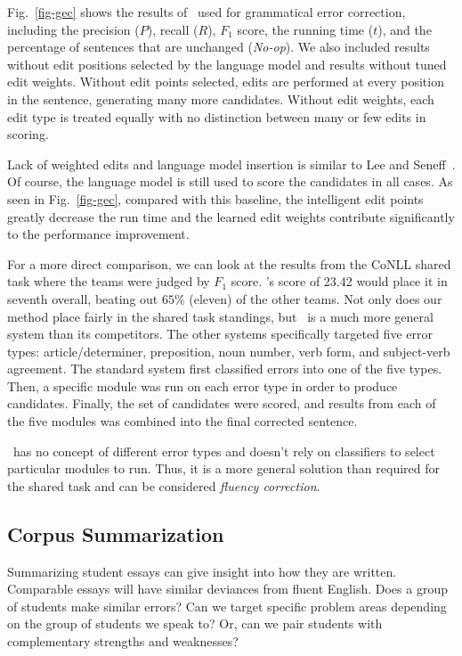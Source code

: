 Fig.~\ref{fig-gec} shows the results of \sd~used for grammatical error
correction, including the precision ($P$), recall ($R$), $F_1$ score, the
running time ($t$), and the percentage of sentences that are unchanged
(\emph{No-op}).  We also included results without edit positions selected by the
language model and results without tuned edit weights. Without edit points
selected, edits are performed at every position in the sentence, generating many
more candidates. Without edit weights, each edit type is treated equally with no
distinction between many or few edits in scoring.

Lack of weighted edits and language model insertion is similar to Lee and
Seneff~\cite{lee-seneff-2006}. Of course, the language model is still used to
score the candidates in all cases. As seen in Fig.~\ref{fig-gec}, compared with this baseline, the intelligent
edit points greatly decrease the run time and the learned edit weights contribute
significantly to the performance improvement.

For a more direct comparison, we can look at the results from the CoNLL shared
task where the teams were judged by $F_1$ score. \sd's score of 23.42 would
place it in seventh overall, beating out $65\%$ (eleven) of the other teams. Not
only does our method place fairly in the shared task standings, but \sd~is a
much more general system than its competitors. The other systems specifically
targeted five error types: article/determiner, preposition, noun number, verb
form, and subject-verb agreement. The standard system first classified errors
into one of the five types. Then, a specific module was run on each error type
in order to produce candidates. Finally, the set of candidates were scored, and
results from each of the five modules was combined into the final corrected
sentence.

\sd~has no concept of different error types and doesn't rely on classifiers to
select particular modules to run. Thus, it is a more general solution than
required for the shared task and can be considered \emph{fluency correction}.

\subsection{Corpus Summarization}

Summarizing student essays can give insight into how they are written.
Comparable essays will have similar deviances from fluent English. Does a group
of students make similar errors? Can we target specific problem areas depending
on the group of students we speak to? Or, can we pair students with
complementary strengths and weaknesses?

